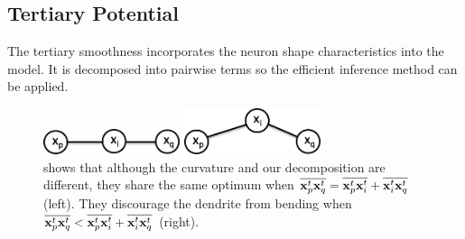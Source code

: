 \documentclass{article}
\begin{document}
\subsection{Tertiary Potential} \label{sec:tertiary_pot}
The tertiary smoothness incorporates the neuron shape characteristics into the model. It is decomposed into pairwise terms so the efficient inference method can be applied.

\begin{figure}[tb!]
	\centering
	\begin{minipage}[b]{0.49\linewidth}
		\centerline{\includegraphics[width=4cm]{img/tri1.png}}
	\end{minipage}
	\begin{minipage}[b]{0.49\linewidth}
		\centerline{\includegraphics[width=4cm]{img/tri2.png}}
	\end{minipage}
	\vspace{-10pt}
	\caption{\small{shows that although the curvature and our decomposition are different, they share the same optimum when $\overline{{\bf x}_p^t {\bf x}_q^t} = \overline{{\bf x}_p^t {\bf x}_i^t} + \overline{{\bf x}_i^t {\bf x}_q^t}$ (left). They discourage the dendrite from bending when $\overline{{\bf x}_p^t {\bf x}_q^t} < \overline{{\bf x}_p^t {\bf x}_i^t} + \overline{{\bf x}_i^t {\bf x}_q^t}$ (right).}}
	\label{fig:triangle}
	\vspace{-10pt}
\end{figure}
\end{document}
